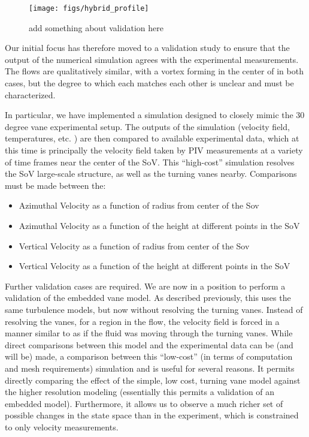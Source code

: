   \begin{figure}[!htb]
    \begin{center}
     \texttt{[image: figs/hybrid\_profile]}
     \caption{add something about validation here}
     \label{fig:lab}
    \end{center}
  \end{figure}

%
%
%

Our initial focus has therefore moved to a validation study to ensure that the
output of the numerical simulation agrees with the experimental
measurements. The flows are qualitatively similar, with a vortex forming
in the center of in both cases, but the degree to which each matches
each other is unclear and must be characterized. 

In particular, we have implemented a simulation designed
to closely mimic the 30 degree vane experimental setup. The outputs of
the simulation (velocity field, temperatures, etc. ) are then compared
to available experimental data, which at this time is principally the
velocity field taken by PIV measurements at a variety of time frames
near the center of the SoV. This ``high-cost'' simulation resolves
the SoV large-scale structure, as well as the turning vanes
nearby. Comparisons must be made between the:
\begin{itemize}
 \item Azimuthal Velocity as a function of radius from center of the Sov
 \item Azimuthal Velocity as a function of the height at different
       points in the SoV
 \item Vertical Velocity as a function of radius from center of the Sov
 \item Vertical Velocity as a function of the height at different
       points in the SoV
\end{itemize}

%
%
Further validation cases are required. We are now in a position to perform
a validation of the embedded vane model. As described previously, this
uses the same turbulence models, but now without resolving the turning
vanes. Instead of resolving the vanes, for a region in the flow, the
velocity field is forced in a manner similar to as if the fluid was
moving through the turning vanes. While direct comparisons between this
model and the experimental data can be (and will be) made, a comparison
between this ``low-cost'' (in terms of computation and mesh
requirements) simulation and is useful for several reasons. It permits
directly comparing the effect of the simple, low cost, turning vane
model against the higher resolution modeling (essentially this permits a
validation of an embedded model). Furthermore, it allows us to observe a
much richer set of possible changes in the state space than in the
experiment, which is constrained to only velocity measurements. 


